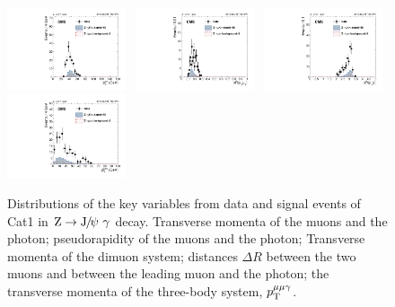 \begin{figure}[h]
		  \includegraphics[width=0.31\textwidth]{Fig/Final_NoPreliminary/ZJpsiG/pTmumu_EBHR9}~
		  \includegraphics[width=0.31\textwidth]{Fig/Final_NoPreliminary/ZJpsiG/delR_Muons_EBHR9}~
		  \includegraphics[width=0.31\textwidth]{Fig/Final_NoPreliminary/ZJpsiG/delR_leMuPho_EBHR9}\\
		  \includegraphics[width=0.31\textwidth]{Fig/Final_NoPreliminary/ZJpsiG/pTmmg_EBHR9}\\
		
		  \caption{Distributions of the key variables from data and signal events of Cat1 in $\cPZ\to\JPsi\ \gamma$ decay.
		    Transverse momenta of the muons and the photon;
		    pseudorapidity of the muons and the photon;
		    Transverse momenta of the dimuon system;
		    distances $\Delta R$ between the two muons and between the leading muon and the photon;
		    the transverse momenta of the three-body system, $p_{\mathrm{T}}^{\mu\mu\gamma}$.}
		  \label{fig:dist-4}
		\end{figure}
		\clearpage
		
